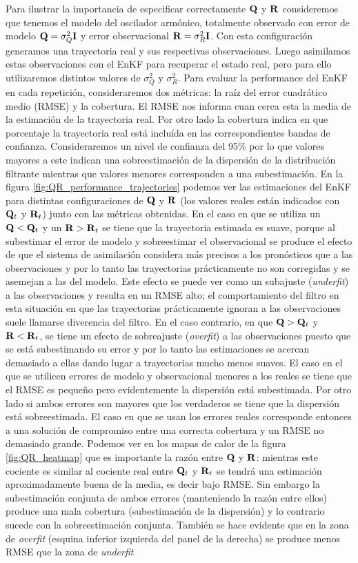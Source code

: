 Para ilustrar la importancia de especificar correctamente $\mathbf{Q}$ y $\mathbf{R}$ consideremos que tenemos el modelo del oscilador armónico, totalmente observado con error de modelo $\mathbf{Q} = \sigma_Q^2 \mathbf{I}$ y error observacional $\mathbf{R} = \sigma_R^2 \mathbf{I}$. Con esta configuración generamos una trayectoria real y sus respectivas observaciones. Luego asimilamos estas observaciones con el EnKF para recuperar el estado real, pero para ello utilizaremos distintos valores de $\sigma_Q^2$ y $\sigma_R^2$. Para evaluar la performance del EnKF en cada repetición, consideraremos dos métricas: la raíz del error cuadrático medio (RMSE) y la cobertura. El RMSE nos informa cuan cerca esta la media de la estimación de la trayectoria real. Por otro lado la cobertura indica en que porcentaje la trayectoria real está incluída en las correspondientes bandas de confianza. Consideraremos un nivel de confianza del 95\% por lo que valores mayores a este indican una sobreestimación de la dispersión de la distribución filtrante mientras que valores menores corresponden a una subestimación. En la figura \ref{fig:QR_performance_trajectories} podemos ver las estimaciones del EnKF para distintas configuraciones de $\mathbf{Q}$ y $\mathbf{R}$ (los valores reales están indicados con $\mathbf{Q}_t$ y $\mathbf{R}_t$) junto con las métricas obtenidas. En el caso en que se utiliza un $\mathbf{Q} < \mathbf{Q}_t$ y un $\mathbf{R} > \mathbf{R}_t$ se tiene que la trayectoria estimada es suave, porque al subestimar el error de modelo y sobreestimar el observacional se produce el efecto de que el sistema de asimilación considera más precisos a los pronósticos que a las observaciones y por lo tanto las trayectorias prácticamente no son corregidas y se asemejan a las del modelo. Este efecto se puede ver como un subajuste (\textit{underfit}) a las observaciones y resulta en un RMSE alto; el comportamiento del filtro en esta situación en que las trayectorias prácticamente ignoran a las observaciones suele llamarse diverencia del filtro. En el caso contrario, en que $\mathbf{Q} > \mathbf{Q}_t$ y $\mathbf{R} < \mathbf{R}_t$, se tiene un efecto de sobreajuste (\textit{overfit}) a las observaciones puesto que se está subestimando su error y por lo tanto las estimaciones se acercan demasiado a ellas dando lugar a trayectorias mucho menos suaves. El caso en el que se utilicen errores de modelo y observacional menores a los reales se tiene que el RMSE es pequeño pero evidentemente la dispersión está subestimada. Por otro lado si ambos errores son mayores que los verdaderos se tiene que la dispersión está sobreestimada. El caso en que se usan los errores reales corresponde entonces a una solución de compromiso entre una correcta cobertura y un RMSE no demasiado grande. Podemos ver en los mapas de calor de la figura \ref{fig:QR_heatmap} que es importante la razón entre $\mathbf{Q}$ y $\mathbf{R}$: mientras este cociente es similar al cociente real entre $\mathbf{Q}_t$ y $\mathbf{R}_t$ se tendrá una estimación aproximadamente buena de la media, es decir bajo RMSE. Sin embargo la subestimación conjunta de ambos errores (manteniendo la razón entre ellos) produce una mala cobertura (subestimación de la dispersión) y lo contrario sucede con la sobreestimación conjunta. También se hace evidente que en la zona de \textit{overfit} (esquina inferior izquierda del panel de la derecha) se produce menos RMSE que la zona de \textit{underfit} 